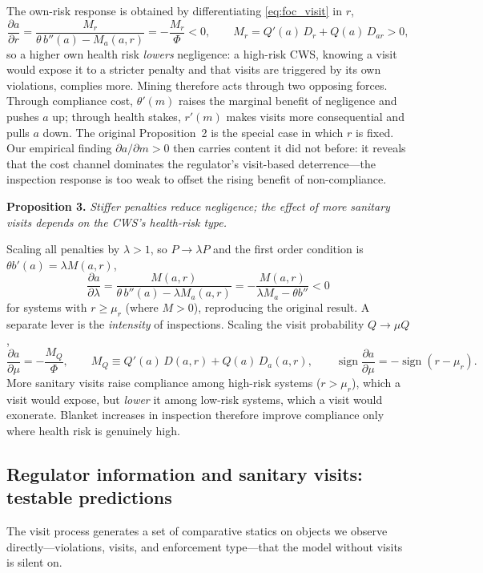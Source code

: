 The own-risk response is obtained by differentiating \eqref{eq:foc_visit} in $r$,
\[
\frac{\partial a}{\partial r} = \frac{M_r}{\theta\, b''(a) - M_a(a,r)} = -\frac{M_r}{\Phi} < 0, \qquad M_r = Q'(a)\,D_r + Q(a)\,D_{ar} > 0 ,
\]
so a higher own health risk \emph{lowers} negligence: a high-risk CWS, knowing a visit would expose it to a stricter penalty and that visits are triggered by its own violations, complies more. Mining therefore acts through two opposing forces. Through compliance cost, $\theta'(m)$ raises the marginal benefit of negligence and pushes $a$ up; through health stakes, $r'(m)$ makes visits more consequential and pulls $a$ down. The original Proposition~2 is the special case in which $r$ is fixed. Our empirical finding $\partial a/\partial m > 0$ then carries content it did not before: it reveals that the cost channel dominates the regulator's visit-based deterrence---the inspection response is too weak to offset the rising benefit of non-compliance.

\medskip
\noindent\textbf{Proposition 3.} \emph{Stiffer penalties reduce negligence; the effect of more sanitary visits depends on the CWS's health-risk type.}

Scaling all penalties by $\lambda>1$, so $P \to \lambda P$ and the first order condition is $\theta b'(a) = \lambda M(a,r)$,
\[
\frac{\partial a}{\partial\lambda} = \frac{M(a,r)}{\theta\, b''(a) - \lambda M_a(a,r)} = -\frac{M(a,r)}{\lambda M_a - \theta b''} < 0
\]
for systems with $r \ge \mu_r$ (where $M>0$), reproducing the original result. A separate lever is the \emph{intensity} of inspections. Scaling the visit probability $Q \to \mu Q$,
\[
\frac{\partial a}{\partial\mu} = -\frac{M_Q}{\Phi}, \qquad M_Q \equiv Q'(a)\,D(a,r) + Q(a)\,D_a(a,r), \qquad \operatorname{sign}\frac{\partial a}{\partial\mu} = -\operatorname{sign}(r-\mu_r) .
\]
More sanitary visits raise compliance among high-risk systems ($r>\mu_r$), which a visit would expose, but \emph{lower} it among low-risk systems, which a visit would exonerate. Blanket increases in inspection therefore improve compliance only where health risk is genuinely high.

\subsection{Regulator information and sanitary visits: testable predictions}

The visit process generates a set of comparative statics on objects we observe directly---violations, visits, and enforcement type---that the model without visits is silent on.

